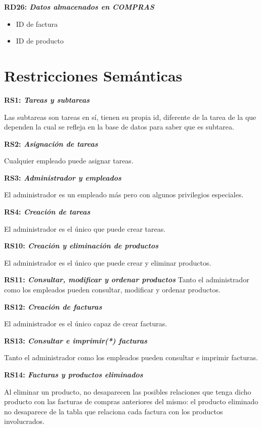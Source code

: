 \documentclass[paper=a4, fontsize=11pt, spanish]{scrartcl}
\begin{document}
	\setlength{\parindent}{0em}
	\textbf{RD26: \textit{Datos almacenados en COMPRAS}}
	\setlength{\parindent}{2em}
	\begin{itemize}
		\item ID de factura
		\item ID de producto
	\end{itemize}
	
	\section{Restricciones Semánticas}
	\setlength{\parindent}{0em}
	\textbf{RS1: \textit{Tareas y subtareas}}
	\setlength{\parindent}{2em}
	
	Las subtareas son tareas en sí, tienen su propia id, diferente de la tarea de la que dependen la cual se refleja en la base de datos para saber que es subtarea.
	
	\setlength{\parindent}{0em}
	\textbf{RS2: \textit{Asignación de tareas}}
	\setlength{\parindent}{2em}
	
	Cualquier empleado puede asignar tareas.
	
	\setlength{\parindent}{0em}
	\textbf{RS3: \textit{Administrador y empleados}}
	\setlength{\parindent}{2em}
	
	El administrador es un empleado más pero con algunos privilegios especiales.
	
	\setlength{\parindent}{0em}
	\textbf{RS4: \textit{Creación de tareas}}
	\setlength{\parindent}{2em}
	
	El administrador es el único que puede crear tareas.

	\setlength{\parindent}{0em}
	\textbf{RS10: \textit{Creación y eliminación de productos}}
	\setlength{\parindent}{2em}

	El administrador es el único que puede crear y eliminar productos. 

	\setlength{\parindent}{0em}
	\textbf{RS11: \textit{Consultar, modificar y ordenar productos}}
	\setlength{\parindent}{2em}
	Tanto el administrador como los empleados pueden consultar, modificar y ordenar productos.
	
	\setlength{\parindent}{0em}
	\textbf{RS12: \textit{Creación de facturas}}
	\setlength{\parindent}{2em}
	
	El administrador es el único capaz de crear facturas.
	
	
	\setlength{\parindent}{0em}
	\textbf{RS13: \textit{Consultar e imprimir(*) facturas}}
	\setlength{\parindent}{2em}
	
	Tanto el administrador como los empleados pueden consultar e imprimir facturas.
	
	\setlength{\parindent}{0em}
	\textbf{RS14: \textit{Facturas y productos eliminados}}
	\setlength{\parindent}{2em}
	
	Al eliminar un producto, no desaparecen las posibles relaciones que tenga dicho producto con las facturas de compras anteriores del mismo: el producto eliminado no desaparece de la tabla que relaciona cada factura con los productos involucrados.
\end{document}
